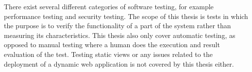 There exist several different categories of software testing, for
example performance testing and security testing. The scope of this
thesis is tests in which the purpose is to verify the functionality of a
part of the system rather than measuring its characteristics. This
thesis also only cover automatic testing, as opposed to manual testing
where a human does the execution and result evaluation of the test.
Testing static views or any issues related to the deployment of a
dynamic web application is not covered by this thesis either.
